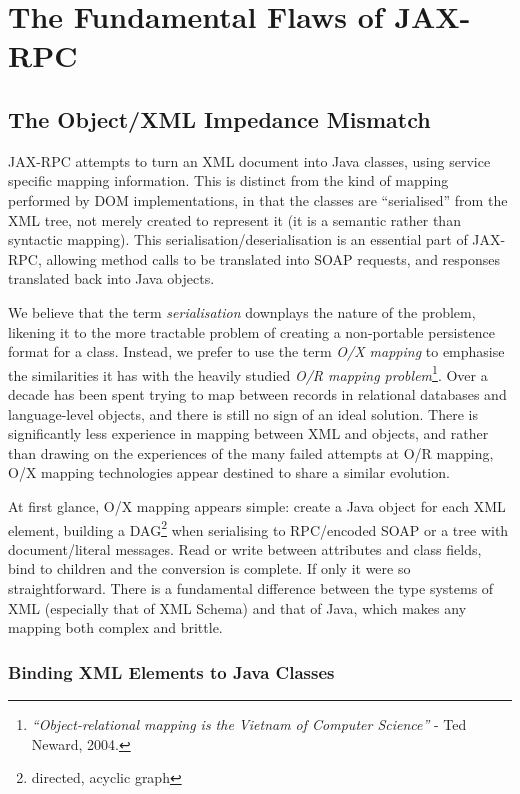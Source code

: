 \section{The Fundamental Flaws of JAX-RPC}
\label{objections}

\subsection{The Object/XML Impedance Mismatch}
\label{objections:o-x}

JAX-RPC attempts to turn an XML document into Java classes, using
service specific mapping information. This is distinct from the kind
of mapping performed by DOM implementations, in that the classes are
``serialised'' from the XML tree, not merely created to represent it
(it is a semantic rather than syntactic mapping). This
serialisation/deserialisation is an essential part of JAX-RPC,
allowing method calls to be translated into SOAP requests, and
responses translated back into Java objects.

We believe that the term \emph{serialisation} downplays the nature of
the problem, likening it to the more tractable problem of creating a
non-portable persistence format for a class. Instead, we prefer to use
the term \emph{O/X mapping} to emphasise the similarities it has with
the heavily studied \emph{O/R mapping problem}\footnote{
\emph{``Object-relational mapping is the Vietnam of Computer Science''}
- Ted Neward, 2004.
}. 
Over a decade has been spent trying to map between records in relational
databases and language-level objects, and there is still no sign of an ideal
solution. There is significantly less experience in mapping between XML and
objects, and rather than drawing on the experiences of the many failed attempts
at O/R mapping, O/X mapping technologies appear destined to share a similar
evolution.

At first glance, O/X mapping appears simple: create a Java object for
each XML element, building a DAG\footnote{directed, acyclic graph}
when serialising to RPC/encoded SOAP or a tree with document/literal
messages. Read or write between attributes and class fields, bind to
children and the conversion is complete. If only it were so
straightforward. There is a fundamental difference between the type
systems of XML (especially that of XML Schema) and that of Java, which
makes any mapping both complex and brittle.

\subsubsection{Binding XML Elements to Java Classes}
\label{objections:o-x:xml-classes}

